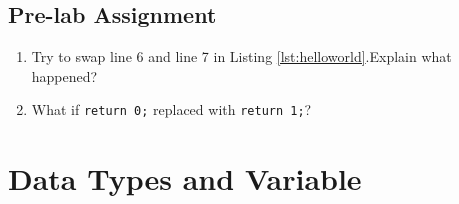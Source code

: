 \begin{itemize}
\end{itemize}
\subsection{Pre-lab Assignment}
\begin{enumerate}
	\item Try to swap line 6 and line 7 in Listing \ref{lst:helloworld}.Explain what happened?
	\item What if \verb|return 0;| replaced with \verb|return 1;|?
\end{enumerate}


\section{Data Types and Variable}
